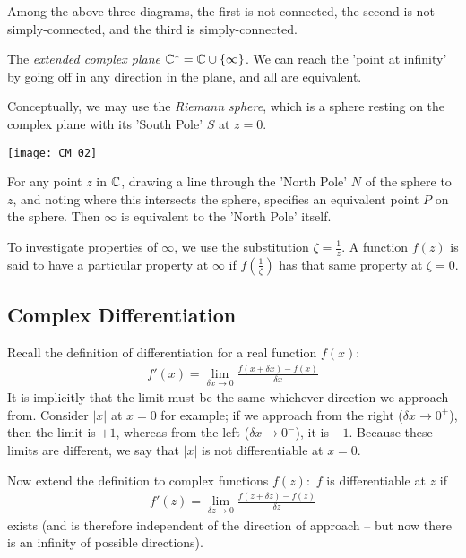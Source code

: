 \documentclass[a4paper]{article}
\begin{document}
Among the above three diagrams, the first is not connected, the second is not simply-connected, and the third is simply-connected.

\begin{defi}
The \emph{extended complex plane} $\mathbb{C}^*=\mathbb{C} \cup \{\infty\}$. We can reach the 'point at infinity' by going off in any direction in the plane, and all are equivalent.

Conceptually, we may use the \emph{Riemann sphere}, which is a sphere resting on the complex plane with its 'South Pole' $S$ at $z=0$.
\end{defi}

\texttt{[image: CM\_02]}

For any point $z$ in $\mathbb{C}$, drawing a line through the 'North Pole' $N$ of the sphere to $z$, and noting where this intersects the sphere, specifies an equivalent point $P$ on the sphere. Then $\infty$ is equivalent to the 'North Pole' itself.

To investigate properties of $\infty$, we use the substitution $\zeta = \frac{1}{z}$. A function $f(z)$ is said to have a particular property at $\infty$ if $f(\frac{1}{\zeta})$ has that same property at $\zeta = 0$. 

\subsection{Complex Differentiation}
Recall the definition of differentiation for a real function $f(x)$:
\begin{equation*}
\begin{aligned}
f'(x) = \lim_{\delta x \to 0} \frac{f(x+\delta x)-f(x)}{\delta x}
\end{aligned}
\end{equation*}
It is implicitly that the limit must be the same whichever direction we approach from. Consider $|x|$ at $x=0$ for example; if we approach from the right ($\delta x \to 0^+$), then the limit is $+1$, whereas from the left ($\delta x \to 0^-$), it is $-1$. Because these limits are different, we say that $|x|$ is not differentiable at $x=0$.

Now extend the definition to complex functions $f(z):$ $f$ is differentiable at $z$ if
\begin{equation*}
\begin{aligned}
f'(z) = \lim_{\delta z\to 0} \frac{f(z+\delta z)-f(z)}{\delta z}
\end{aligned}
\end{equation*}
exists (and is therefore independent of the direction of approach -- but now there is an infinity of possible directions).
\end{document}
